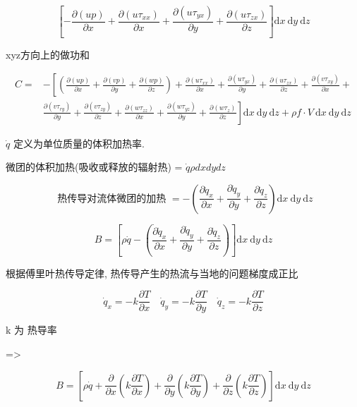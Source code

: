 \documentclass[UTF8]{ctexart}
\begin{document}
$$
	\left[-\frac{\partial(u p)}{\partial x}+\frac{\partial\left(u \tau_{x x}\right)}{\partial x}+\frac{\partial\left(u \tau_{y x}\right)}{\partial y}+\frac{\partial\left(u \tau_{z x}\right)}{\partial z}\right] \mathrm{d} x \mathrm{~d} y \mathrm{~d} z
$$

xyz方向上的做功和

$$
	\begin{aligned}
		C= & -\left[\left(\frac{\partial(u p)}{\partial x}+\frac{\partial(v p)}{\partial y}+\frac{\partial(w p)}{\partial z}\right)+\frac{\partial\left(u \tau_{x x}\right)}{\partial x}+\frac{\partial\left(u \tau_{y x}\right)}{\partial y}+\frac{\partial\left(u \tau_{z x}\right)}{\partial z}+\frac{\partial\left(v \tau_{x y}\right)}{\partial x}+\right.                                    \\
		   & \left.\frac{\partial\left(v \tau_{r y}\right)}{\partial y}+\frac{\partial\left(v \tau_{z y}\right)}{\partial z}+\frac{\partial\left(w \tau_{z z}\right)}{\partial x}+\frac{\partial\left(w \tau_{y z}\right)}{\partial y}+\frac{\partial\left(w \tau_{z}\right)}{\partial z}\right] \mathrm{d} x \mathrm{~d} y \mathrm{~d} z+\rho f \cdot V \mathrm{~d} x \mathrm{~d} y \mathrm{~d} z
	\end{aligned}
$$

$\dot{q}$ 定义为单位质量的体积加热率.

微团的体积加热(吸收或释放的辐射热) = $\dot{q} \rho dxdydz$

$$
	\text { 热传导对流体微团的加热 }=-\left(\frac{\partial \dot{q}_{x}}{\partial x}+\frac{\partial \dot{q}_{y}}{\partial y}+\frac{\partial \dot{q}_{z}}{\partial z}\right) \mathrm{d} x \mathrm{~d} y \mathrm{~d} z
$$

$$
	B=\left[\rho \dot{q}-\left(\frac{\dot{\partial} \dot{q}_{x}}{\partial x}+\frac{\partial \dot{q}_{y}}{\partial y}+\frac{\partial \dot{q}_{z}}{\partial z}\right)\right] \mathrm{d} x \mathrm{~d} y \mathrm{~d} z
$$

根据傅里叶热传导定律, 热传导产生的热流与当地的问题梯度成正比

$$
	\dot{q}_{x}=-k \frac{\partial T}{\partial x} \quad \dot{q}_{y}=-k \frac{\partial T}{\partial y} \quad \dot{q}_{z}=-k \frac{\partial T}{\partial z}
$$

k 为 热导率

=>

$$
	B=\left[\rho \dot{q}+\frac{\partial}{\partial x}\left(k \frac{\partial T}{\partial x}\right)+\frac{\partial}{\partial y}\left(k \frac{\partial T}{\partial y}\right)+\frac{\partial}{\partial z}\left(k \frac{\partial T}{\partial z}\right)\right] \mathrm{d} x \mathrm{~d} y \mathrm{~d} z
$$
\end{document}
